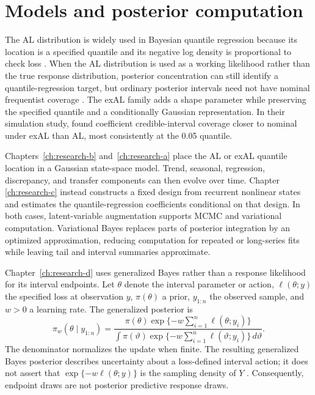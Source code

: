 \section{Models and posterior computation}
\label{sec:intro-updating}

The AL distribution is widely used in Bayesian quantile
regression because its location is a specified quantile and its negative log
density is proportional to check loss \citep{env-yu2001bayesian}. When the AL
distribution is used as a working likelihood rather than the true response
distribution, posterior concentration can still identify a quantile-regression
target, but ordinary posterior intervals need not have nominal frequentist
coverage
\citep{env-sriram2013theoretical,qdesn-YangWangHe2016ALInference,
qdesn-JiLeeRabeHesketh2025ValidSE}. The exAL family adds a shape parameter
while preserving the specified quantile and a conditionally Gaussian
representation. In their simulation study, \citet{exd-yan2025family} found
coefficient credible-interval coverage closer to nominal under exAL than AL,
most consistently at the 0.05 quantile.

Chapters~\ref{ch:research-b} and~\ref{ch:research-a} place the AL or exAL
quantile location in a Gaussian state-space model. Trend, seasonal, regression,
discrepancy, and transfer components can then evolve over time. Chapter
\ref{ch:research-c} instead constructs a fixed design from recurrent nonlinear
states and estimates the quantile-regression coefficients conditional on that
design. In both cases, latent-variable augmentation supports MCMC and
variational computation. Variational Bayes replaces parts of posterior
integration by an optimized approximation, reducing computation for repeated
or long-series fits while leaving tail and interval summaries approximate.

Chapter~\ref{ch:research-d} uses generalized Bayes rather than a response
likelihood for its interval endpoints. Let \(\theta\) denote the interval
parameter or action, \(\ell(\theta;y)\) the specified loss at observation
\(y\), \(\pi(\theta)\) a prior, \(y_{1:n}\) the observed sample, and \(w>0\) a
learning rate. The generalized posterior is
\begin{equation}
\pi_w(\theta\mid y_{1:n})
=
\frac{
\pi(\theta)\exp\{-w\sum_{i=1}^n\ell(\theta;y_i)\}
}{
\int \pi(\vartheta)
\exp\{-w\sum_{i=1}^n\ell(\vartheta;y_i)\}\,d\vartheta
}.
\label{eq:intro-generalized-bayes}
\end{equation}
The denominator normalizes the update when finite. The resulting generalized
Bayes posterior describes
uncertainty about a loss-defined interval action; it does not assert that
\(\exp\{-w\ell(\theta;y)\}\) is the sampling density of \(Y\)
\citep{rqr-BissiriHolmesWalker2016GeneralBayes}. Consequently, endpoint draws
are not posterior predictive response draws.

